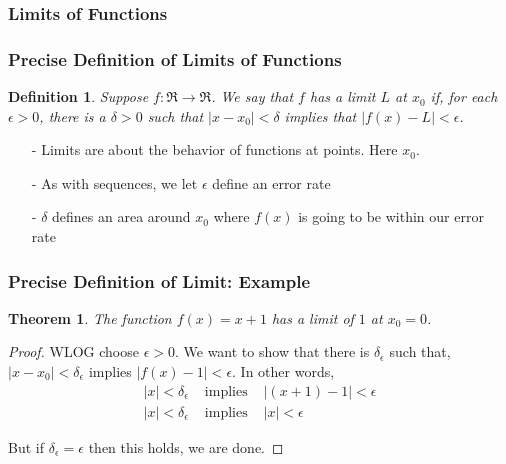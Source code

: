 \documentclass{beamer}
\newtheorem{thm}{Theorem}
\newtheorem{defn}{Definition}
\numberwithin{equation}{section}
\begin{document}
\begin{frame}
\frametitle{Limits of Functions} 

\begin{center}
\end{center}

\end{frame}
\begin{frame}
\frametitle{Precise Definition of Limits of Functions}

\begin{defn} Suppose $f: \Re \rightarrow \Re$.  We say that $f$ has a limit $L$ at $x_{0}$ if, for each $\epsilon>0$, there is a $\delta>0$ such that $|x - x_{0}|< \delta$ implies that $|f(x) - L| < \epsilon$.  
\end{defn}

\begin{itemize}
\item[-] Limits are about the behavior of functions at \alert{points}.  Here $x_{0}$. 
\item[-] As with sequences, we let $\epsilon$ define an \alert{error rate}
\item[-] $\delta$ defines an area around $x_{0}$ where $f(x)$ is going to be within our error rate
\end{itemize}


\end{frame}



\begin{frame}
\frametitle{Precise Definition of Limit: Example}

\begin{thm} The function $f(x) = x + 1$ has a limit of $1$ at $x_{0} = 0$.  \end{thm}

\begin{proof}  WLOG choose $\epsilon >0$.  We want to show that there is $\delta_{\epsilon}$ such that, 
$|x - x_{0}| < \delta_{\epsilon}$ implies $|f(x) - 1 |< \epsilon$.  In other words, 
\begin{eqnarray}
|x | < \delta_{\epsilon} & \text{ implies } & | (x + 1) - 1|< \epsilon \nonumber \\
|x| < \delta_{\epsilon} & \text { implies } & |x|< \epsilon \nonumber 
\end{eqnarray}

But if $\delta_{\epsilon}  = \epsilon$ then this holds, we are done. 
\end{proof}
\end{frame}
\end{document}
